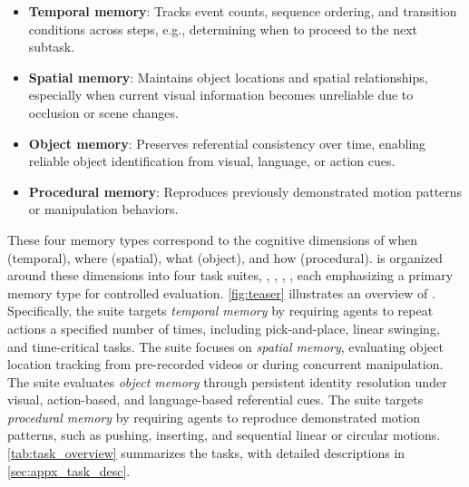 \begin{itemize}[itemsep=1pt, topsep=0pt, leftmargin=*]
\item \textbf{Temporal memory}: Tracks event counts, sequence ordering, and transition conditions across steps, e.g., determining when to proceed to the next subtask.

\item \textbf{Spatial memory}: Maintains object locations and spatial relationships, especially when current visual information becomes unreliable due to occlusion or scene changes.

\item \textbf{Object memory}: Preserves referential consistency over time, enabling reliable object identification from visual, language, or action cues.

\item \textbf{Procedural memory}: Reproduces previously demonstrated motion patterns or manipulation behaviors.

\end{itemize}

These four memory types correspond to the cognitive dimensions of when (temporal), where (spatial), what (object), and how (procedural).
\benchname\xspace is organized around these dimensions into four task suites, \TSone, \TStwo, \TSthree, \TSfour, each emphasizing a primary memory type for controlled evaluation. \cref{fig:teaser} illustrates an overview of \benchname. Specifically, the \TSone\xspace suite targets \textit{temporal memory} by requiring agents to repeat actions a specified number of times, including pick-and-place, linear swinging, and time-critical  tasks.
The \TStwo\xspace suite focuses on \textit{spatial memory}, evaluating object location tracking from pre-recorded videos or during concurrent manipulation.
The \TSthree\xspace suite evaluates \textit{object memory} through persistent identity resolution under visual, action-based, and language-based referential cues.
The \TSfour\xspace suite targets \textit{procedural memory} by requiring agents to reproduce demonstrated motion patterns, such as pushing, inserting, and sequential linear or circular motions.
\cref{tab:task_overview} summarizes the tasks, with detailed descriptions in \cref{sec:appx_task_desc}.


